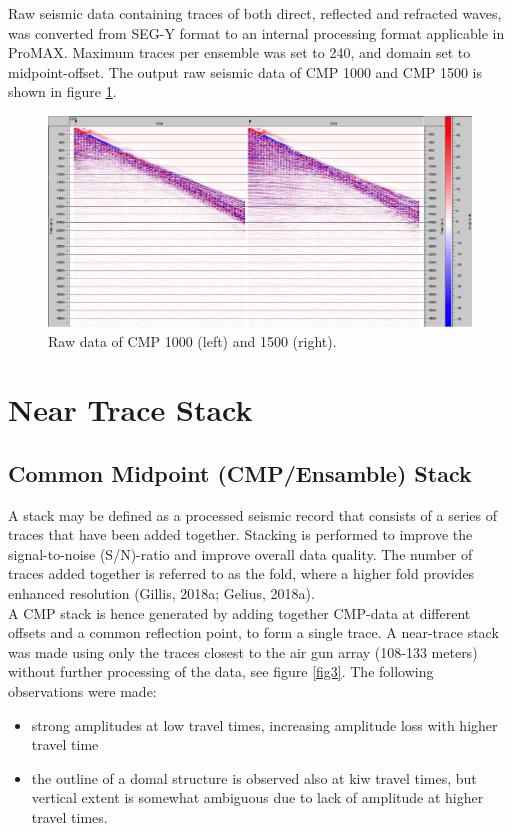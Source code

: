 \documentclass[10pt,a4paper]{article}
\begin{document}
Raw seismic data containing traces of both direct, reflected and refracted waves, was converted from SEG-Y format to an internal processing format applicable in ProMAX. Maximum traces per ensemble was set to 240, and domain set to midpoint-offset. The output raw seismic data of CMP 1000 and CMP 1500 is shown in figure \ref{fig2}.

\begin{figure}[H]
\includegraphics[width=\textwidth]{fig2.jpg}
\caption{Raw data of CMP 1000 (left) and 1500 (right).}
\label{fig2}
\end{figure}

\section{Near Trace Stack}

\subsection{Common Midpoint (CMP/Ensamble) Stack}

A stack may be defined as a processed seismic record that consists of a series of traces that have been added together. Stacking is performed to improve the signal-to-noise (S/N)-ratio and improve overall data quality. The number of traces added together is referred to as the fold, where a higher fold provides enhanced resolution (Gillis, 2018a; Gelius, 2018a).
\\
A CMP stack is hence generated by adding together CMP-data at different offsets and a common reflection point, to form a single trace. A near-trace stack was made using only the traces closest to the air gun array (108-133 meters) without further processing of the data, see figure \ref{fig3}. The following observations were made:

\begin{itemize}
    \item strong amplitudes at low travel times, increasing amplitude loss with higher travel time
    \item the outline of a domal structure is observed also at kiw travel times, but vertical extent is somewhat ambiguous due to lack of amplitude at higher travel times.
\end{itemize}
\end{document}

